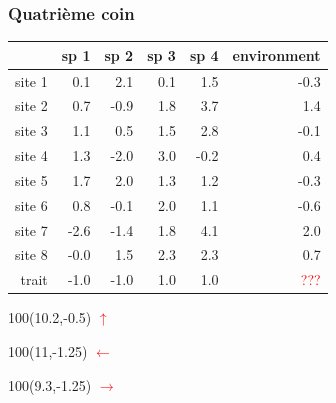 \documentclass{beamer}
\numberwithin{exercise}{section}
\begin{document}
\begin{frame}
\frametitle{Quatri\`{e}me coin}
\small
\begin{table}[ht]
\begin{center}
\begin{tabular}{r|rrrr|r|}
  & sp 1 & sp 2 & sp 3 & sp 4 & environment \\ 
  \hline
site 1 & 0.1 & 2.1 & 0.1 & 1.5 & -0.3 \\ 
  site 2 & 0.7 & -0.9 & 1.8 & 3.7 & 1.4 \\ 
  site 3 & 1.1 & 0.5 & 1.5 & 2.8 & -0.1 \\ 
  site 4 & 1.3 & -2.0 & 3.0 & -0.2 & 0.4 \\ 
  site 5 & 1.7 & 2.0 & 1.3 & 1.2 & -0.3 \\ 
  site 6 & 0.8 & -0.1 & 2.0 & 1.1 & -0.6 \\ 
  site 7 & -2.6 & -1.4 & 1.8 & 4.1 & 2.0 \\ 
  site 8 & -0.0 & 1.5 & 2.3 & 2.3 & 0.7 \\ 
   \hline
  trait & -1.0 & -1.0 & 1.0 & 1.0 & \textcolor{red}{???} \\ 
   \hline
\end{tabular}
\end{center}
\end{table}\normalsize 
\begin{textblock}{100}(10.2,-0.5)
\textcolor{red}{$\uparrow$}
\end{textblock}
\begin{textblock}{100}(11,-1.25)
\textcolor{red}{$\leftarrow$}
\end{textblock}
\begin{textblock}{100}(9.3,-1.25)
\textcolor{red}{$\rightarrow$}
\end{textblock}
\end{frame}
\end{document}
